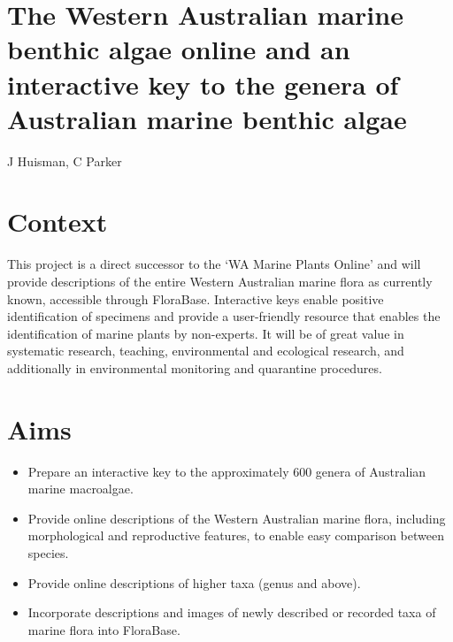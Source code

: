 \documentclass[version=last,
    paper=a4, %
    10pt, %
    usenames,
    dvipsnames,
    oneside, %
    headings=openany, %
    DIV=15 %
]{scrbook}
\begin{document}
\section*{The Western Australian marine benthic algae online and an interactive
key to the genera of Australian marine benthic algae
}

J Huisman, C Parker


\section*{Context}
This project is a direct successor to the `WA Marine Plants Online' and
will provide descriptions of the entire Western Australian marine flora
as currently known, accessible through FloraBase. Interactive keys
enable positive identification of specimens and provide a user-friendly
resource that enables the identification of marine plants by
non-experts. It will be of great value in systematic research, teaching,
environmental and ecological research, and additionally in environmental
monitoring and quarantine procedures.



\section*{Aims}
\begin{itemize}
\itemsep1pt\parskip0pt
\item
  Prepare an interactive key to the approximately 600 genera of
  Australian marine macroalgae.
\item
  Provide online descriptions of the Western Australian marine flora,
  including morphological and reproductive features, to enable easy
  comparison between species.
\item
  Provide online descriptions of higher taxa (genus and above).
\item
  Incorporate descriptions and images of newly described or recorded
  taxa of marine flora into FloraBase.
\end{itemize}
\end{document}
